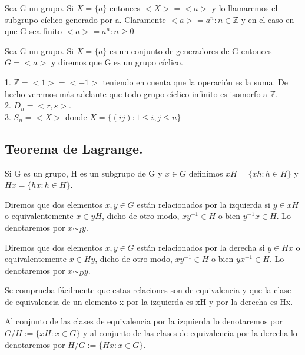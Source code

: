 \begin{definition}
Sea G un grupo. Si $X = \{a\}$ entonces $<X> = <a>$ y lo llamaremos el subgrupo cíclico generado por a. Claramente $<a> = {a^n : n \in \mathbb{Z}}$ y en el caso en que G sea finito $<a> = {a^n : n \ge 0}$
\end{definition}

\begin{definition}
Sea G un grupo. Si $X = \{a\}$ es un conjunto de generadores de G entonces $G = <a>$ y diremos que G es un grupo cíclico.
\end{definition}

\begin{example}
1. $\mathbb{Z} = <1> = <-1>$ teniendo en cuenta que la operación es la suma. De hecho veremos más adelante que todo grupo cíclico infinito es isomorfo a $\mathbb{Z}$.\\
2. $D_n = <r,s>$. \\
3. $S_n = <X>$ donde $X = \{(ij):1 \le i,j \le n\}$
\end{example}

\subsection{Teorema de Lagrange.}

\begin{definition}
Si G es un grupo, H es un subgrupo de G y $x \in G$ definimos $xH = \{xh:h \in H\}$ y $Hx = \{hx:h \in H\}$.

Diremos que dos elementos $x,y \in G$ están relacionados por la izquierda si $y \in xH$ o equivalentemente $x \in yH$, dicho de otro modo, $xy^{-1} \in H$ o bien $y^{-1}x \in H$. Lo denotaremos por $x \sim_{I} y$.

Diremos que dos elementos $x,y \in G$ están relacionados por la derecha si $y \in Hx$ o equivalentemente $x \in Hy$, dicho de otro modo, $xy^{-1} \in H$ o bien $yx^{-1} \in H$. Lo denotaremos por $x \sim_{D} y$.

Se comprueba fácilmente que estas relaciones son de equivalencia y que la clase de equivalencia de un elemento x por la izquierda es xH y por la derecha es Hx.

Al conjunto de las clases de equivalencia por la izquierda lo denotaremos por $G/H := \{xH : x \in G \}$ y al conjunto de las clases de equivalencia por la derecha lo denotaremos por $H/G := \{Hx : x \in G \}$.
\end{definition}

